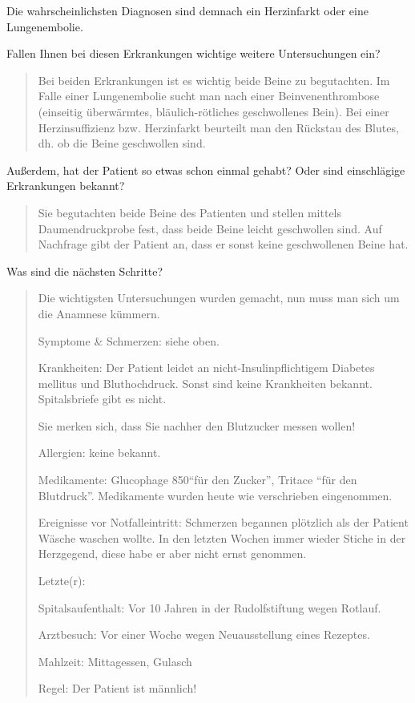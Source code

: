 Die wahrscheinlichsten Diagnosen sind demnach ein
Herzinfarkt oder eine Lungenembolie.

\noindent Fallen Ihnen bei diesen Erkrankungen wichtige
weitere Untersuchungen ein?

\begin{quote}
  Bei beiden Erkrankungen ist es
  wichtig beide Beine zu begutachten. Im Falle einer Lungenembolie sucht man nach
  einer Beinvenenthrombose (einseitig überwärmtes, bläulich-rötliches geschwollenes
  Bein). Bei einer Herzinsuffizienz bzw. Herzinfarkt beurteilt man den Rückstau des
  Blutes, dh. ob die Beine geschwollen sind.
\end{quote}


\noindent Außerdem, hat der Patient so etwas schon einmal
gehabt? Oder sind einschlägige Erkrankungen bekannt?  

\begin{quote}
  Sie begutachten beide Beine des Patienten und stellen mittels
  Daumendruckprobe fest, dass beide Beine leicht geschwollen sind. Auf
  Nachfrage gibt der Patient an, dass er sonst keine geschwollenen Beine
  hat.
\end{quote}

\noindent Was sind die nächsten Schritte?

\begin{quote}
  Die wichtigsten Untersuchungen wurden gemacht, nun muss man sich um die
  Anamnese kümmern.
  
  Symptome \& Schmerzen: siehe oben.
  
  Krankheiten: Der Patient leidet an nicht-Insulinpflichtigem Diabetes
  mellitus und Bluthochdruck. Sonst sind keine Krankheiten bekannt.
  Spitalsbriefe gibt es nicht.
  
  Sie merken sich, dass Sie nachher den Blutzucker messen wollen!
  
  Allergien: keine bekannt.
  
  Medikamente: Glucophage 850\Mg* \enquote{für den Zucker},
  Tritace \enquote{für den Blutdruck}. Medikamente wurden heute wie verschrieben eingenommen.
  
  Ereignisse vor Notfalleintritt: Schmerzen begannen plötzlich als der
  Patient Wäsche waschen wollte. In den letzten Wochen immer wieder
  Stiche in der Herzgegend, diese habe er aber nicht ernst genommen.
  
  Letzte(r):
  
  Spitalsaufenthalt: Vor 10 Jahren in der Rudolfstiftung wegen Rotlauf.
  
  Arztbesuch: Vor einer Woche wegen Neuausstellung eines Rezeptes.
  
  Mahlzeit: Mittagessen, Gulasch
  
  Regel: Der Patient ist männlich!
\end{quote}
% 

